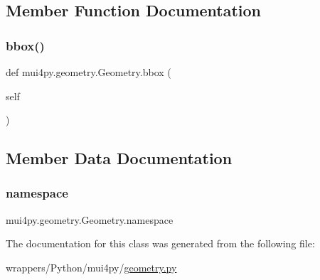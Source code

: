 \subsection{Member Function Documentation}
\mbox{\label{classmui4py_1_1geometry_1_1_geometry_ad32b8e1fdc5dbc35909ff03f4787df8e}} 
\subsubsection{\texorpdfstring{bbox()}{bbox()}}
{\footnotesize\ttfamily def mui4py.\+geometry.\+Geometry.\+bbox (\begin{DoxyParamCaption}\item[{}]{self }\end{DoxyParamCaption})}



\subsection{Member Data Documentation}
\mbox{\label{classmui4py_1_1geometry_1_1_geometry_a953a13572dab2da3a02d9ce4ff010139}} 
\subsubsection{\texorpdfstring{namespace}{namespace}}
{\footnotesize\ttfamily mui4py.\+geometry.\+Geometry.\+namespace}



The documentation for this class was generated from the following file\+:\begin{DoxyCompactItemize}
\item 
wrappers/\+Python/mui4py/\hyperlink{geometry_8py}{geometry.\+py}\end{DoxyCompactItemize}
